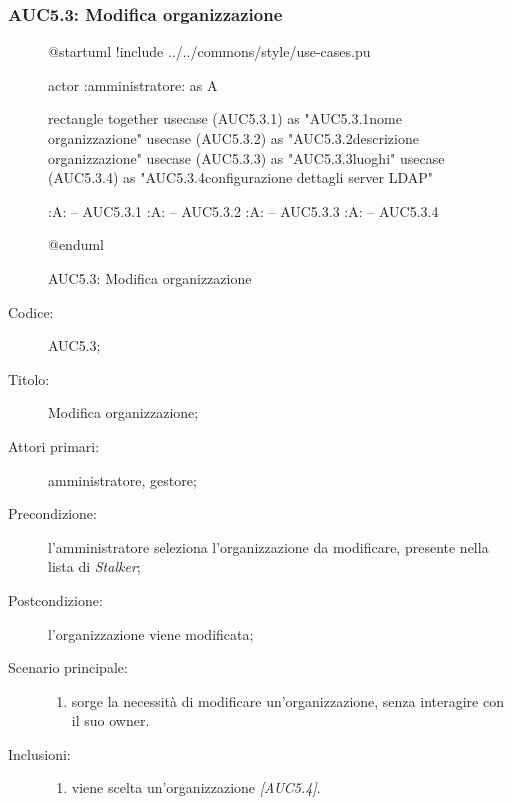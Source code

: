 \documentclass[../../../analisi-dei-requisiti.tex]{subfiles}
\begin{document}
\subsubsection{AUC5.3: Modifica organizzazione}%
\label{subs:AUC5.3}

\begin{figure}[H]
  \centering
  \begin{plantuml}
    @startuml
    !include ../../commons/style/use-cases.pu

    actor :amministratore: as A

    rectangle {
        together {
            usecase (AUC5.3.1) as "AUC5.3.1\nModifica nome organizzazione"
            usecase (AUC5.3.2) as "AUC5.3.2\nModifica descrizione organizzazione"
            usecase (AUC5.3.3) as "AUC5.3.3\nGestione luoghi"
            usecase (AUC5.3.4) as "AUC5.3.4\nModifica configurazione dettagli server LDAP"
          }
      }

    :A: -- AUC5.3.1
    :A: -- AUC5.3.2
    :A: -- AUC5.3.3
    :A: -- AUC5.3.4

    @enduml
  \end{plantuml}
  \caption{AUC5.3: Modifica organizzazione}%
  \label{fig:AUC5_3}
\end{figure}

\begin{description}
  \item[Codice:] AUC5.3;
  \item[Titolo:] Modifica organizzazione;
  \item[Attori primari:] amministratore, gestore;
  \item[Precondizione:] l'amministratore seleziona l'organizzazione da modificare, presente nella lista di \emph{Stalker};
  \item[Postcondizione:] l'organizzazione viene modificata;
  \item[Scenario principale:]
        \begin{enumerate}
          \item sorge la necessità di modificare un'organizzazione, senza interagire con il suo owner.
        \end{enumerate}
  \item[Inclusioni:]
        \begin{enumerate}
          \item viene scelta un'organizzazione \emph{[AUC5.4]}.
        \end{enumerate}
\end{description}
\end{document}
